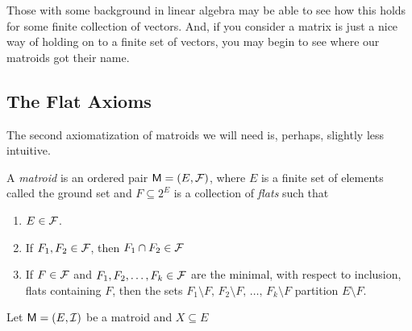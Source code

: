 \documentclass[12pt,oneside]{../../sfsuthesis}
\begin{document}
Those with some background in linear algebra may be able to see how this holds for some finite collection of vectors.
And, if you consider a matrix is just a nice way of holding on to a finite set of vectors, you may begin to see where our matroids got their name.


\subsection{The Flat Axioms}

The second axiomatization of matroids we will need is, perhaps, slightly less intuitive.
\begin{definition}{\label{def:MatroidFlatAxioms}}
    A \emph{matroid} is an ordered pair \( \mathsf{M} = (E, \mathcal{F}) \), where \( E \) is a finite set of elements called the ground set and \( F \subseteq 2^E \) is a collection of \emph{flats}
    such that
    \begin{enumerate}[label=\roman*.]
        \item \( E \in \mathcal{F} \).
        \item If \(F_1, F_2 \in \mathcal{F}\), then \( F_1 \cap F_2 \in \mathcal{F} \)
        \item If \( F \in \mathcal{F} \) and \(F_1, F_2, \dots , F_k \in \mathcal{F} \) are the minimal, with respect to inclusion, flats containing \( F \),
              then the sets \( F_1 \setminus F,\, F_2 \setminus F,\, \dots,\, F_k \setminus F \) partition \( E \setminus F \).
    \end{enumerate}
\end{definition}

\begin{definition}[Closure]{\label{def:Closure}}
    \hfill

\end{definition}


\begin{definition}[Rank]{\label{def:rank}}
    Let \( \mathsf{M} = (E, \mathcal{I}) \) be a matroid and \( X \subseteq E \)
\end{definition}

\end{document}
